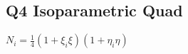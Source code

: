 \hypertarget{q4-isoparametric-quad}{%
\subsection{Q4 Isoparametric Quad}\label{q4-isoparametric-quad}}

\(N_i=\frac{1}{4}(1+\xi_i \xi)(1+\eta_i \eta)\)
